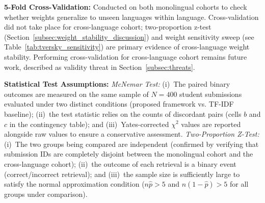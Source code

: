 \textbf{5-Fold Cross-Validation:} Conducted on both monolingual cohorts to check whether weights generalize to unseen languages within language. Cross-validation did not take place for cross-language cohort; two-proportion z-test (Section~\ref{subsec:weight_stability_discussion}) and weight sensitivity sweep (see Table~\ref{tab:tversky_sensitivity}) are primary evidence of cross-language weight stability. Performing cross-validation for cross-language cohort remains future work, described as validity threat in Section~\ref{subsec:threats}.

\textbf{Statistical Test Assumptions:} \textit{McNemar Test:} (i)~The paired binary outcomes are measured on the same sample of $N{=}400$ student submissions evaluated under two distinct conditions (proposed framework vs. TF-IDF baseline); (ii)~the test statistic relies on the counts of discordant pairs (cells $b$ and $c$ in the contingency table); and (iii)~Yates-corrected $\chi^2$ values are reported alongside raw values to ensure a conservative assessment. \textit{Two-Proportion Z-Test:} (i)~The two groups being compared are independent (confirmed by verifying that submission IDs are completely disjoint between the monolingual cohort and the cross-language cohort); (ii)~the outcome of each retrieval is a binary event (correct/incorrect retrieval); and (iii)~the sample size is sufficiently large to satisfy the normal approximation condition ($n\hat{p} > 5$ and $n(1-\hat{p}) > 5$ for all groups under comparison).

